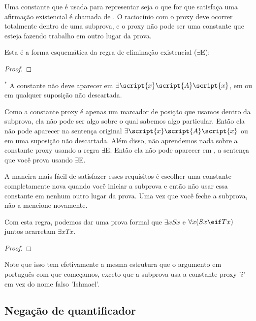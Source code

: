 Uma constante que é usada para representar seja o que for que satisfaça uma afirmação existencial é chamada de . O raciocínio com o proxy deve ocorrer totalmente dentro de uma subprova, e o proxy não pode ser uma constante que esteja fazendo trabalho em outro lugar da prova.

Esta é a forma esquemática da regra de eliminação existencial ($\exists$E): 

\begin{proof}
	\open	
	\close
	 
\end{proof}
$^\ast$ A constante  não deve aparecer em $\exists\script{x}\script{A}\script{x}$, em  ou em qualquer suposição não descartada.

Como a constante proxy é apenas um marcador de posição que usamos dentro da subprova, ela não pode ser algo sobre o qual sabemos algo particular. Então ela não pode aparecer na sentença original $\exists\script{x}\script{A}\script{x}$ ou em uma suposição não descartada. Além disso, não aprendemos nada sobre a constante proxy usando a regra $\exists$E. Então ela não pode aparecer em , a sentença que você prova usando $\exists$E.

A maneira mais fácil de satisfazer esses requisitos é escolher uma constante completamente nova quando você iniciar a subprova e então não usar essa constante em nenhum outro lugar da prova. Uma vez que você feche a subprova, não a mencione novamente.

Com esta regra, podemos dar uma prova formal que $\exists x Sx$ e $\forall x(Sx \eif Tx)$ juntos acarretam $\exists x Tx$.

\begin{proof}
	\open
		 
	\close
\end{proof}

Note que isso tem efetivamente a mesma estrutura que o argumento em português com que começamos, exceto que a subprova usa a constante proxy '$i$' em vez do nome falso 'Ishmael'.

\subsection{Negação de quantificador}

